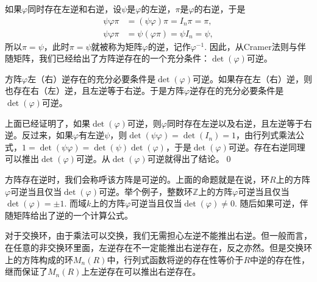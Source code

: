 \para 如果$\varphi$同时存在左逆和右逆，设$\psi$是$\varphi$的左逆，$\pi$是$\varphi$的右逆，于是
\[
\begin{aligned}
	\psi\varphi\pi&=(\psi\varphi)\pi=I_n \pi=\pi,\\
	\psi\varphi\pi&=\psi(\varphi\pi)=\psi I_n=\psi,
\end{aligned}
\]
所以$\pi=\psi$，此时$\pi=\psi$就被称为矩阵$\varphi$的逆，记作$\varphi^{-1}$. 因此，从Cramer法则与伴随矩阵，我们已经给出了方阵逆存在的一个充分条件：$\det(\varphi)$可逆。

\pro 方阵$\varphi$左（右）逆存在的充分必要条件是$\det(\varphi)$可逆。如果存在左（右）逆，则也存在右（左）逆，且左逆等于右逆。于是方阵$\varphi$逆存在的充分必要条件是$\det(\varphi)$可逆。

\proof 上面已经证明了，如果$\det(\varphi)$可逆，则$\varphi$同时存在左逆以及右逆，且左逆等于右逆。反过来，如果$\varphi$有左逆$\psi$，则$\det(\psi\varphi)=\det(I_n)=1$，由行列式乘法公式，$1=\det(\psi\varphi)=\det(\psi)\det(\varphi)$，于是$\det(\varphi)$可逆。存在右逆同理可以推出$\det(\varphi)$可逆。从$\det(\varphi)$可逆就得出了结论。\qed

方阵存在逆时，我们会称呼该方阵是可逆的。上面的命题就是在说，环$R$上的方阵$\varphi$可逆当且仅当$\det(\varphi)$可逆。举个例子，整数环$\mathbb{Z}$上的方阵$\varphi$可逆当且仅当$\det(\varphi)=\pm 1$. 而域$k$上的方阵$\varphi$可逆当且仅当$\det(\varphi)\neq 0$. 随后如果可逆，伴随矩阵给出了逆的一个计算公式。

对于交换环，由于乘法可以交换，我们无需担心左逆不能推出右逆。但一般而言，在任意的非交换环里面，左逆存在不一定能推出右逆存在，反之亦然。但是交换环上的方阵构成的环$M_n(R)$中，行列式函数将逆的存在性等价于$R$中逆的存在性，继而保证了$M_n(R)$上左逆存在可以推出右逆存在。